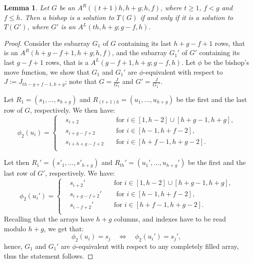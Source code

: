 \documentclass{amsart}
\newtheorem{lem}[prop]{Lemma}
\theoremstyle{definition}
\numberwithin{equation}{section}
\begin{document}
\begin{lem} \label{lemma:equiv1}
Let $G$ be an $A^{R}((t+1)h, h+g; h,f)$, where $t \geq 1$, $f<g$ and $f \leq h$. Then a bishop is a solution to $T(G)$ if and only if it is a solution to $T(G')$, where $G'$ is an $A^{L}(th,h+g; g-f,h)$.
\end{lem} 
\begin{proof}
Consider the subarray $G_1$ of $G$ containing its last $h+g-f+1$ rows, that is an $A^{R}(h+g-f+1,h+g; h,f)$, and the subarray $G_1'$ of $G'$ containing its last $g-f+1$ rows, that is a $A^{L}(g-f+1,h+g;g-f,h)$. Let $\phi$ be the bishop's move function, we show that $G_1$ and $G_1'$ are $\phi$-equivalent with respect to
$J := J_{th-g+f-1,h+g}$; note that 
$G=\frac{J}{G_1}$ and $G'=\frac{J}{G_1'}$.

Let $R_1 =(s_1, \dotsc, s_{h+g}) $ and $R_{(t+1)h} = (u_1,\dotsc, u_{h+g})$ be the first and the last row of $G$, respectively. We then have:
\[
\phi_2(u_i) = \left\{
\begin{aligned}
&s_{i+2}  \quad &\text{for $i\in[1,h-2] \cup [h+g-1,h+g]$,} \\ 
&s_{i+g-f+2}   \quad &\text{for $i\in [h-1, h+f-2]$,} \\
&s_{i+h+g-f+2} \quad &\text{for $i\in [h+f-1, h+g-2]$.} \\
\end{aligned}
\right.
\]

Let then $R_1' = (s'_1, \dotsc, s'_{h+g}) $ and $R_{th}' =(u_1',\dotsc, u_{h+g}') $  be the first and the last row of $G'$, respectively. We have:
\[
\phi_2(u_i') = \left\{
\begin{aligned}
&s_{i+2}'  \quad &\text{for  $i\in[1,h-2] \cup [h+g-1,h+g]$,} \\
&s_{i+g-f+2}' \quad &\text{ for $i\in [h-1, h+f-2]$, } \\
&s_{i-f+2}' \quad &\text{for $i\in [h+f-1, h+g-2]$.} \\
\end{aligned}
\right.
\]
Recalling that the arrays have $h+g$ columns, and indexes have to be read modulo $h+g$, we get that:
\[
\phi_2(u_i) = s_j \quad \Leftrightarrow \quad \phi_2(u_i')=s_j', 
\]
hence, $G_1$ and $G_1'$ are $\phi$-equivalent with respect to any completely filled array, thus the statement follows.
\end{proof}
\end{document}
